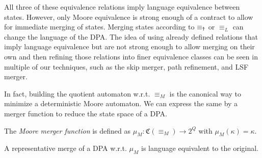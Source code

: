 All three of these equivalence relations imply language equivalence between states. However, only Moore equivalence is strong enough of a contract to allow for immediate merging of states. Merging states according to $\equiv_\text{\Ankh}$ or $\equiv_L$ can change the language of the DPA. The idea of using already defined relations that imply language equivalence but are not strong enough to allow merging on their own and then refining those relations into finer equivalence classes can be seen in multiple of our techniques, such as the skip merger, path refinement, and LSF merger.

In fact, building the quotient automaton w.r.t. $\equiv_M$ is the canonical way to minimize a deterministic Moore automaton. We can express the same by a merger function to reduce the state space of a DPA.

\begin{definition}
	The \emph{Moore merger function} is defined as $\mu_M : \mathfrak{C}(\equiv_M) \rightarrow 2^Q$ with $\mu_M(\kappa) = \kappa$.
\end{definition}

\begin{theorem}
	A representative merge of a DPA w.r.t. $\mu_M$ is language equivalent to the original.
\end{theorem}





